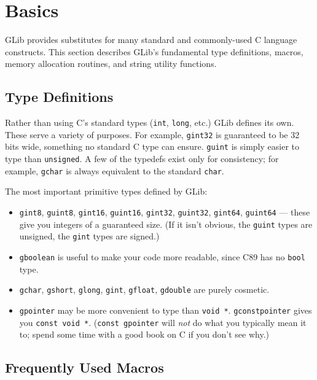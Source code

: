 \section{Basics}

GLib provides substitutes for many standard and commonly-used C language constructs. This section describes GLib's fundamental type definitions, macros, memory allocation routines, and string utility functions.

\subsection{Type Definitions}

Rather than using C's standard types (\lstinline{int}, \lstinline{long}, etc.) GLib defines its own. These serve a variety of purposes. For example, \lstinline{gint32} is guaranteed to be 32 bits wide, something no standard C type can ensure. \lstinline{guint} is simply easier to type than \lstinline{unsigned}. A few of the typedefs exist only for consistency; for example, \lstinline{gchar} is always equivalent to the standard \lstinline{char}.

The most important primitive types defined by GLib:
\begin{itemize}
  \item \lstinline{gint8}, \lstinline{guint8}, \lstinline{gint16}, \lstinline{guint16}, \lstinline{gint32}, \lstinline{guint32}, \lstinline{gint64}, \lstinline{guint64} --- these give you integers of a guaranteed size. (If it isn't obvious, the \lstinline{guint} types are unsigned, the \lstinline{gint} types are signed.)

  \item \lstinline{gboolean} is useful to make your code more readable, since C89 has no \lstinline{bool} type.

  \item \lstinline{gchar}, \lstinline{gshort}, \lstinline{glong}, \lstinline{gint}, \lstinline{gfloat}, \lstinline{gdouble} are purely cosmetic.

  \item \lstinline{gpointer} may be more convenient to type than \lstinline{void *}. \lstinline{gconstpointer} gives you \lstinline{const void *}. (\lstinline{const gpointer} will \emph{not} do what you typically mean it to; spend some time with a good book on C if you don't see why.)
\end{itemize}

\subsection{Frequently Used Macros}


